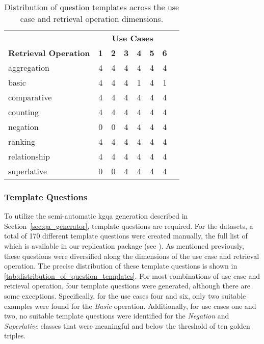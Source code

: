 \begin{table}[t]
\centering
\begin{tabular}{lccccccc}
\toprule
\textbf{} & \multicolumn{6}{c}{\textbf{Use Cases}} \\
\cmidrule(lr){2-7}
\textbf{Retrieval Operation} & \textbf{1} & \textbf{2} & \textbf{3} & \textbf{4} & \textbf{5} & \textbf{6} \\
\midrule
aggregation   & 4 & 4 & 4 & 4 & 4 & 4 \\
basic         & 4 & 4 & 4 & 1 & 4 & 1 \\
comparative   & 4 & 4 & 4 & 4 & 4 & 4 \\
counting      & 4 & 4 & 4 & 4 & 4 & 4 \\
negation      & 0 & 0 & 4 & 4 & 4 & 4 \\
ranking       & 4 & 4 & 4 & 4 & 4 & 4 \\
relationship  & 4 & 4 & 4 & 4 & 4 & 4 \\
superlative   & 0 & 0 & 4 & 4 & 4 & 4 \\
\bottomrule
\end{tabular}
\caption[Distribution of Question Templates]{Distribution of question templates across the use case and retrieval operation dimensions.}
\label{tab:distribution_of_question_templates}
\end{table}

\subsubsection{Template Questions} 

To utilize the semi-automatic \gls{kgqa} generation described in Section~\ref{sec:qa_generator}, template questions are required. For the datasets, a total of 170 different template questions were created manually, the full list of which is available in our replication package (see \cite{schneider_replication_2025}). As mentioned previously, these questions were diversified along the dimensions of the use case and retrieval operation. The precise distribution of these template questions is shown in \autoref{tab:distribution_of_question_templates}. For most combinations of use case and retrieval operation, four template questions were generated, although there are some exceptions. Specifically, for the use cases four and six, only two suitable examples were found for the \emph{Basic} operation. Additionally, for use cases one and two, no suitable template questions were identified for the \emph{Negation} and \emph{Superlative} classes that were meaningful and below the threshold of ten golden triples.


